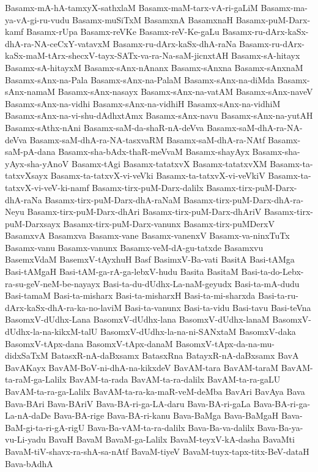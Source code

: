 {Basamx-mA-hA-tamxyX-sathxlaM
Basamx-maM-tarx-vA-ri-gaLiM
Basamx-ma-ya-vA-gi-ru-vudu
Basamx-muSiTxM
BasamxnA
BasamxnaH
Basamx-puM-Darx-kamf
Basamx-rUpa
Basamx-reVKe
Basamx-reV-Ke-gaLu
Basamx-ru-dArx-kaSx-dhA-ra-NA-ceCxY-vatavxM
Basamx-ru-dArx-kaSx-dhA-raNa
Basamx-ru-dArx-kaSx-maM-tArx-shecxV-tayx-SATx-va-ra-Na-saM-jicnxtAH
Basamx-sA-hitayx
Basamx-sA-hitayxM
Basamx-sAnx-nAnanx
Basamx-sAnxna
Basamx-sAnxnaM
Basamx-sAnx-na-Pala
Basamx-sAnx-na-PalaM
Basamx-sAnx-na-diMda
Basamx-sAnx-namaM
Basamx-sAnx-nasayx
Basamx-sAnx-na-vatAM
Basamx-sAnx-naveV
Basamx-sAnx-na-vidhi
Basamx-sAnx-na-vidhiH
Basamx-sAnx-na-vidhiM
Basamx-sAnx-na-vi-shu-dAdhxtAmx
Basamx-sAnx-navu
Basamx-sAnx-na-yutAH
Basamx-sAthx-nAni
Basamx-saM-da-shaR-nA-deVva
Basamx-saM-dhA-ra-NA-deVva
Basamx-saM-dhA-ra-NA-tasxvaRM
Basamx-saM-dhA-ra-NAtf
Basamx-saM-pA-dana
Basamx-sha-bAdx-thaR-meVvaM
Basamx-shayAyx
Basamx-sha-yAyx-sha-yAnoV
Basamx-tAgi
Basamx-tatatxvX
Basamx-tatatxvXM
Basamx-ta-tatxvXsayx
Basamx-ta-tatxvX-vi-veVki
Basamx-ta-tatxvX-vi-veVkiV
Basamx-ta-tatxvX-vi-veV-ki-namf
Basamx-tirx-puM-Darx-dalilx
Basamx-tirx-puM-Darx-dhA-raNa
Basamx-tirx-puM-Darx-dhA-raNaM
Basamx-tirx-puM-Darx-dhA-ra-Neyu
Basamx-tirx-puM-Darx-dhAri
Basamx-tirx-puM-Darx-dhAriV
Basamx-tirx-puM-Darxsayx
Basamx-tirx-puM-Darx-vanunx
Basamx-tirx-puMDerxV
BasamxvA
Basamxva
Basamx-vane
Basamx-vanenxV
Basamx-va-ninxTuTx
Basamx-vanu
Basamx-vanunx
Basamx-veM-dA-gu-tatxde
Basamxvu
BasemxVdaM
BasemxV-tAyxhuH
Basf
BasimxV-Ba-vati
BasitA
Basi-tAMga
Basi-tAMgaH
Basi-tAM-ga-rA-ga-lebxV-hudu
Basita
BasitaM
Basi-ta-do-Lebx-ra-su-geV-neM-be-nayayx
Basi-ta-du-dUdhx-La-naM-geyudx
Basi-ta-mA-dudu
Basi-tamaM
Basi-ta-misharx
Basi-ta-misharxH
Basi-ta-mi-sharxda
Basi-ta-ru-dArx-kaSx-dhA-ra-ka-no-laviM
Basi-ta-vanunx
Basi-ta-vidu
Basi-tavu
Basi-teVna
BasomxV-dUdhx-Lana
BasomxV-dUdhx-lana
BasomxV-dUdhx-lanaM
BasomxV-dUdhx-la-na-kikxM-talU
BasomxV-dUdhx-la-na-ni-SANxtaM
BasomxV-daka
BasomxV-tApx-dana
BasomxV-tApx-danaM
BasomxV-tApx-da-na-mu-didxSaTxM
BatasxR-nA-daBxsamx
BatasxRna
BatayxR-nA-daBxsamx
BavA
BavAKayx
BavAM-BoV-ni-dhA-na-kikxdeV
BavAM-tara
BavAM-taraM
BavAM-ta-raM-ga-Lalilx
BavAM-ta-rada
BavAM-ta-ra-dalilx
BavAM-ta-ra-gaLU
BavAM-ta-ra-ga-Lalilx
BavAM-ta-ra-ka-maR-veM-deMba
BavAri
BavAya
Bava
Bava-BAri
Bava-BAriV
Bava-BA-ri-ga-LA-daru
Bava-BA-ri-gaLa
Bava-BA-ri-ga-La-nA-daDe
Bava-BA-rige
Bava-BA-ri-kanu
Bava-BaMga
Bava-BaMgaH
Bava-BaM-gi-ta-ri-gA-rigU
Bava-Ba-vAM-ta-ra-dalilx
Bava-Ba-va-dalilx
Bava-Ba-ya-vu-Li-yadu
BavaH
BavaM
BavaM-ga-Lalilx
BavaM-teyxV-kA-dasha
BavaMti
BavaM-tiV-shavx-ra-shA-sa-nAtf
BavaM-tiyeV
BavaM-tuyx-tapx-titx-BeV-dataH
Bava-bAdhA
}
